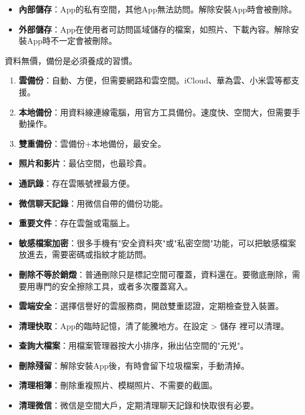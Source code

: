 
\begin{itemize}
  \item \textbf{內部儲存}：App的私有空間，其他App無法訪問。解除安裝App時會被刪除。
  \item \textbf{外部儲存}：App在使用者可訪問區域儲存的檔案，如照片、下載內容。解除安裝App時不一定會被刪除。
\end{itemize}


資料無價，備份是必須養成的習慣。


\begin{enumerate}
  \item \textbf{雲備份}：自動、方便，但需要網路和雲空間。iCloud、華為雲、小米雲等都支援。
  \item \textbf{本地備份}：用資料線連線電腦，用官方工具備份。速度快、空間大，但需要手動操作。
  \item \textbf{雙重備份}：雲備份+本地備份，最安全。
\end{enumerate}


\begin{itemize}
  \item \textbf{照片和影片}：最佔空間，也最珍貴。
  \item \textbf{通訊錄}：存在雲賬號裡最方便。
  \item \textbf{微信聊天記錄}：用微信自帶的備份功能。
  \item \textbf{重要文件}：存在雲盤或電腦上。
\end{itemize}


\begin{itemize}
  \item \textbf{敏感檔案加密}：很多手機有"安全資料夾"或"私密空間"功能，可以把敏感檔案放進去，需要密碼或指紋才能訪問。
  \item \textbf{刪除不等於銷燬}：普通刪除只是標記空間可覆蓋，資料還在。要徹底刪除，需要用專門的安全擦除工具，或者多次覆蓋寫入。
  \item \textbf{雲端安全}：選擇信譽好的雲服務商，開啟雙重認證，定期檢查登入裝置。
\end{itemize}


\begin{itemize}
  \item \textbf{清理快取}：App的臨時記憶，清了能騰地方。在設定 > 儲存 裡可以清理。
  \item \textbf{查詢大檔案}：用檔案管理器按大小排序，揪出佔空間的"元兇"。
  \item \textbf{刪除殘留}：解除安裝App後，有時會留下垃圾檔案，手動清掉。
  \item \textbf{清理相簿}：刪除重複照片、模糊照片、不需要的截圖。
  \item \textbf{清理微信}：微信是空間大戶，定期清理聊天記錄和快取很有必要。
\end{itemize}

